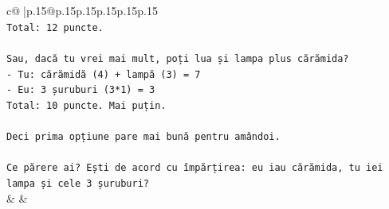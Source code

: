 \documentclass{article}
\begin{document}
{\begin{supertabular}{c@{$\;$}|p{.15\linewidth}@{}p{.15\linewidth}p{.15\linewidth}p{.15\linewidth}p{.15\linewidth}p{.15\linewidth}}
{{{\\ 
\texttt{Total: 12 puncte.} \\
\\ 
\texttt{Sau, dacă tu vrei mai mult, poți lua și lampa plus cărămida?} \\
\texttt{{-} Tu: cărămidă (4) + lampă (3) = 7} \\
\texttt{{-} Eu: 3 șuruburi (3*1) = 3} \\
\texttt{Total: 10 puncte. Mai puțin.} \\
\\ 
\texttt{Deci prima opțiune pare mai bună pentru amândoi.} \\
\\ 
\texttt{Ce părere ai? Ești de acord cu împărțirea: eu iau cărămida, tu iei lampa și cele 3 șuruburi?} \\
            }
        }
    }
    & & \\ \\


\end{supertabular}}
\end{document}
